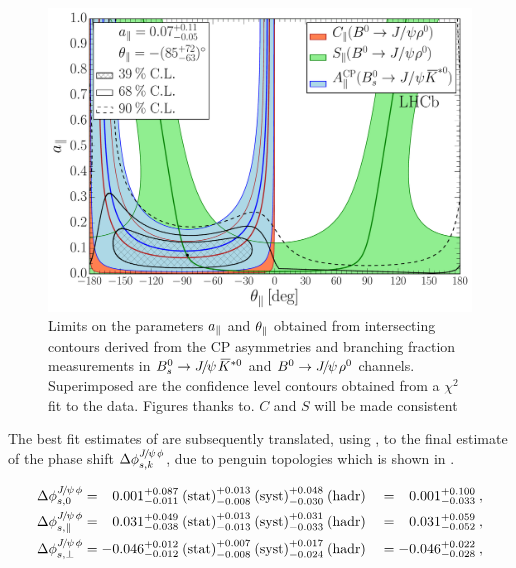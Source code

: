 \begin{figure}[t]
\centering
  \includegraphics[trim=0.0cm 0.0cm 0.0cm 0.0cm, clip=true,scale=0.33]{Figures/Chapter5/Penguin_Contribution_Ang_vs_Abs_allB2VV_Para.pdf}
  \caption{Limits on the parameters $a_{\parallel}$ and $\theta_{\parallel}$ obtained from intersecting contours derived from
           the CP asymmetries and branching fraction measurements in $\BsJpsiKst$ and $\BdJpsiRho$ channels.  Superimposed are the confidence
           level contours obtained from a $\chi^2$ fit to the data. Figures thanks to\cite{DeBruyn-thesis}. {\color{red} $C$ and $S$ will be made consistent}}
  \label{pengPlot_para}
\end{figure}

The best fit estimates of  are subsequently translated, using ,
to the final estimate of the phase shift $\Delta\phi^{{J\mskip -3mu/\mskip -2mu\psi\mskip 2mu}\phi}_{s,{k}}$, due to penguin topologies which is shown in .

\begin{alignat}{2}
\DeltaPhisJpsiPhi{0} & =
\phantom{-}0.001^{+0.087}_{-0.011}\:\text{(stat)}^{+0.013}_{-0.008}\:\text{(syst)}^{+0.048}_{-0.030}\:(\text{hadr})
&& = \phantom{-}0.001^{+0.100}_{-0.033}\:,\\
%
\DeltaPhisJpsiPhi{\parallel} & =
\phantom{-}0.031^{+0.049}_{-0.038}\:\text{(stat)}^{+0.013}_{-0.013}\:\text{(syst)}^{+0.031}_{-0.033}\:(\text{hadr})
&& = \phantom{-}0.031^{+0.059}_{-0.052}\:,\\
%
\DeltaPhisJpsiPhi{\perp} & =
-0.046^{+0.012}_{-0.012}\:\text{(stat)}^{+0.007}_{-0.008}\:\text{(syst)}^{+0.017}_{-0.024}\:(\text{hadr})
&& = -0.046^{+0.022}_{-0.028}\:,
\label{delta_phis_result}
\end{alignat}

